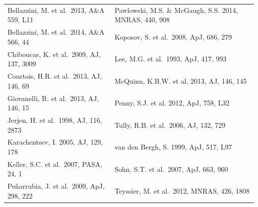 \begin{table}[h]
\begin{tabular}{ll}
Bellazzini, M. et al.\  2013, A\&A 559, L11 & Pawlowski, M.S. \&  McGaugh, S.S. 2014, MNRAS, 440, 908\\
Bellazzini, M. et al.\  2014, A\&A 566, 44 & Koposov, S. et al.\ 2008, ApJ, 686, 279\\
Chiboucas, K. et al.\  2009, AJ, 137, 3009 & Lee, M.G. et al.\ 1993, ApJ, 417, 993\\
Courtois, H.R. et al.\ 2013, AJ, 146, 69 &  McQuinn, K.B.W. et al. 2013, AJ, 146, 145\\
Giovanelli, R. et al.\ 2013, AJ, 146, 15 & Penny, S.J. et al. 2012, ApJ, 758, L32\\
Jerjen, H. et al.\ 1998, AJ, 116, 2873  &  Tully, R.B. et al.\ 2006, AJ, 132, 729\\
Karachentsev, I. 2005, AJ, 129, 178 &van den Bergh, S. 1999, ApJ, 517, L97\\
Keller, S.C. et al.\ 2007, PASA, 24, 1 & Sohn, S.T. et al.\ 2007, ApJ, 663, 960\\
{Pe{\~n}arrubia}, J. et al.\ 2009, ApJ, 298, 222 & Teyssier, M. et al.\ 2012, MNRAS, 426, 1808
\end{tabular}
\end{table}



